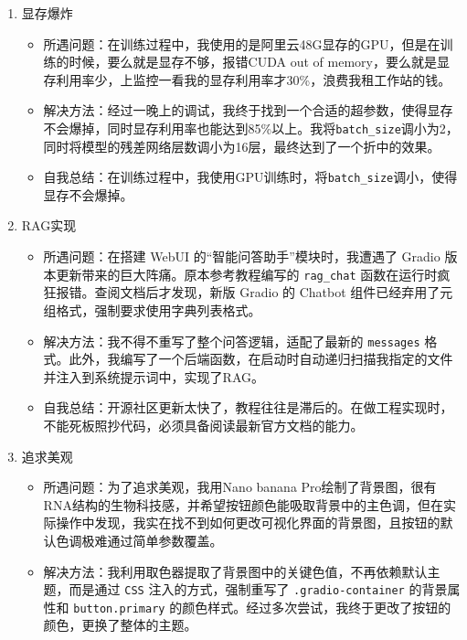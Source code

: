 \documentclass[a4paper,12pt]{article}
\begin{document}
\begin{enumerate}
\begin{itemize}
        \item 解决方法：数据方面，我向客服发出工单，客服告诉我如何高速传输数据；同时，我将环境压缩成压缩包，在工作站里访问本地的文件夹，将本地的环境压缩包在工作站里解压，这样就可以不依赖于网络就快速配置好环境了。
        \item 自我总结：幸好AI工作站可以直接访问我本地的文件夹，否则我可能需要花费非常非常多的时间去配置环境，以至于放弃使用AI工作站。
    \end{itemize}    
    \item 显存爆炸
    \begin{itemize}
        \item 所遇问题：在训练过程中，我使用的是阿里云48G显存的GPU，但是在训练的时候，要么就是显存不够，报错CUDA out of memory，要么就是显存利用率少，上监控一看我的显存利用率才30\%，浪费我租工作站的钱。
        \item 解决方法：经过一晚上的调试，我终于找到一个合适的超参数，使得显存不会爆掉，同时显存利用率也能达到85\%以上。我将\texttt{batch\_size}调小为2，同时将模型的残差网络层数调小为16层，最终达到了一个折中的效果。
        \item 自我总结：在训练过程中，我使用GPU训练时，将\texttt{batch\_size}调小，使得显存不会爆掉。
    \end{itemize}
    \item RAG实现
    \begin{itemize}
        \item 所遇问题：在搭建 WebUI 的“智能问答助手”模块时，我遭遇了 Gradio 版本更新带来的巨大阵痛。原本参考教程编写的 \texttt{rag\_chat} 函数在运行时疯狂报错。查阅文档后才发现，新版 Gradio 的 Chatbot 组件已经弃用了元组格式，强制要求使用字典列表格式。
        \item 解决方法：我不得不重写了整个问答逻辑，适配了最新的 \texttt{messages} 格式。此外，我编写了一个后端函数，在启动时自动递归扫描我指定的文件并注入到系统提示词中，实现了RAG。
        \item 自我总结：开源社区更新太快了，教程往往是滞后的。在做工程实现时，不能死板照抄代码，必须具备阅读最新官方文档的能力。
    \end{itemize}
    \item 追求美观
    \begin{itemize}
        \item 所遇问题：为了追求美观，我用Nano banana Pro绘制了背景图，很有RNA结构的生物科技感，并希望按钮颜色能吸取背景中的主色调，但在实际操作中发现，我实在找不到如何更改可视化界面的背景图，且按钮的默认色调极难通过简单参数覆盖。
        \item 解决方法：我利用取色器提取了背景图中的关键色值，不再依赖默认主题，而是通过 \texttt{CSS} 注入的方式，强制重写了 \texttt{.gradio-container} 的背景属性和 \texttt{button.primary} 的颜色样式。经过多次尝试，我终于更改了按钮的颜色，更换了整体的主题。

\end{itemize}
\end{enumerate}
\end{document}
